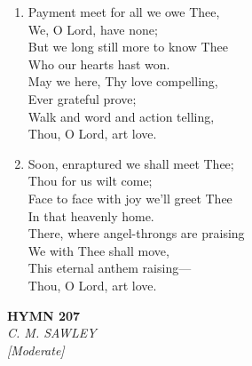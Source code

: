 \begin{enumerate}
    \item Payment meet for all we owe Thee, \\
            We, O Lord, have none; \\
        But we long still more to know Thee \\
            Who our hearts hast won. \\
        May we here, Thy love compelling, \\
            Ever grateful prove; \\
        Walk and word and action telling, \\
            Thou, O Lord, art love.

    \item Soon, enraptured we shall meet Thee; \\
            Thou for us wilt come; \\
        Face to face with joy we'll greet Thee \\
            In that heavenly home. \\
        There, where angel-throngs are praising \\
            We with Thee shall move, \\
        This eternal anthem raising--- \\
            Thou, O Lord, art love.

\end{enumerate}

\newpage
\begin{center}
    {\Large \textbf{HYMN 207}}
    \\
    \textit{C. M. SAWLEY}
    \\
    \textit{\small [Moderate]}
\end{center}
\vspace{1em}

